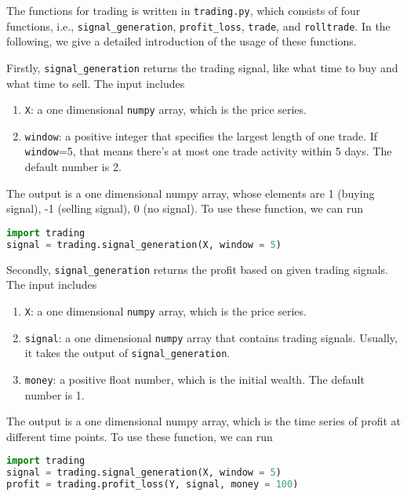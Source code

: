 
The functions for trading is written in \texttt{trading.py}, which consists of four functions, i.e., \texttt{signal\_generation}, \texttt{profit\_loss}, \texttt{trade}, and \texttt{rolltrade}.  In the following, we give a detailed introduction of the usage of these functions.

Firstly, \texttt{signal\_generation} returns the trading signal, like what time to buy and what time to sell. The input includes
\begin{enumerate}
\item \texttt{X}: a one dimensional \texttt{numpy} array, which is the price series.
\item \texttt{window}: a positive integer that specifies the largest length of one trade. If \texttt{window}=5, that means there's at most one trade activity within 5 days. The default number is 2.
\end{enumerate}
The output is a one dimensional numpy array, whose elements are 1 (buying signal), -1 (selling signal), 0 (no signal).
To use these function, we can run 
\begin{lstlisting}[language=Python]
import trading 
signal = trading.signal_generation(X, window = 5) 
\end{lstlisting}

Secondly, \texttt{signal\_generation} returns the profit based on given trading signals. The input includes
\begin{enumerate}
	\item \texttt{X}: a one dimensional \texttt{numpy} array, which is the price series.
	\item \texttt{signal}: a one dimensional \texttt{numpy} array that contains trading signals. Usually, it takes the output of \texttt{signal\_generation}.
	\item \texttt{money}: a positive float number, which is the initial wealth. The default number is 1.
\end{enumerate}
The output is a one dimensional numpy array, which is the time series of profit at different time points.
To use these function, we can run 
\begin{lstlisting}[language=Python]
import trading 
signal = trading.signal_generation(X, window = 5) 
profit = trading.profit_loss(Y, signal, money = 100) 
\end{lstlisting}

